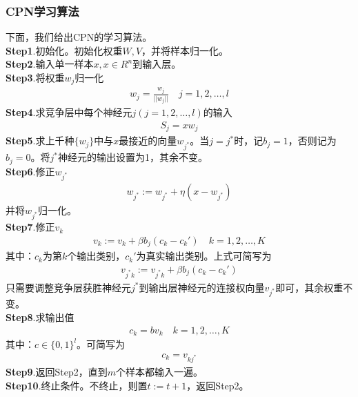 {        \subsubsection{CPN学习算法}
            \par
            下面，我们给出CPN的学习算法。\\
            \textbf{Step1}.初始化。初始化权重$W,V$，并将样本归一化。\\
            \textbf{Step2}.输入单一样本$x,x\in R^n$到输入层。\\
            \textbf{Step3}.将权重$w_j$归一化
            \begin{align*}
            w_j = \frac{w_j}{||w_j||} \quad j=1,2,\dots,l
            \end{align*}
            \textbf{Step4}.求竞争层中每个神经元$j(j =1,2,\dots,l)$的输入
            \begin{align*}
            S_j = xw_j
            \end{align*}
            \textbf{Step5}.求上千种$\{w_j\}$中与$x$最接近的向量$w_{j^*}$。当$j = j^*$时，记$b_j = 1$，否则记为$b_j=0$。将$j^*$神经元的输出设置为1，其余不变。\\
            \textbf{Step6}.修正$w_{j^*}$
            \begin{align*}
            w_{j^*} := w_{j^*} + \eta(x-w_{j^*})
            \end{align*}
            并将$w_{j^*}$归一化。\\
            \textbf{Step7}.修正$v_k$
            \begin{align*}
            v_k:=v_k + \beta b_j(c_k - c_k') \quad k=1,2,\dots,K
            \end{align*}
            其中：$c_k$为第$k$个输出类别，$c_k'$为真实输出类别。上式可简写为
            \begin{align*}
            v_{j^*k}:=v_{j^*k} + \beta b_j(c_k - c_k')
            \end{align*}
            只需要调整竞争层获胜神经元$j^*$到输出层神经元的连接权向量$v_{j^*}$即可，其余权重不变。\\
            \textbf{Step8}.求输出值
            \begin{align*}
            c_k = bv_k \quad k=1,2,\dots,K
            \end{align*}
            其中：$c\in \{0,1\}^l$。可简写为
            \begin{align*}
            c_k = v_{kj^*}
            \end{align*}
            \textbf{Step9}.返回Step2，直到$m$个样本都输入一遍。\\
            \textbf{Step10}.终止条件。不终止，则置$t:=t+1$，返回Step2。

}

